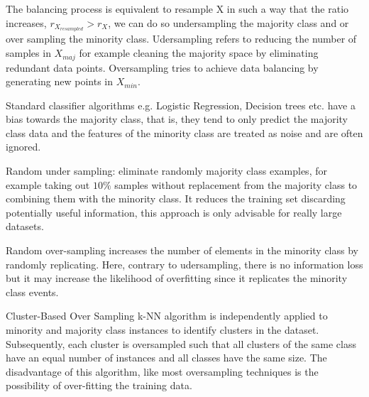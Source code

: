 \documentclass[11pt]{article}
\theoremstyle{definition}
\theoremstyle{remark}
\begin{document}
{%
The balancing process is equivalent to resample X in such a way that the ratio increases, $r_{X_{resampled}} > r_X$, we can do so undersampling the majority class and or over sampling the minority class. Udersampling refers to reducing the number of samples in $X_{maj}$ for example cleaning the majority space by eliminating redundant data points. Oversampling tries to achieve data balancing by generating new points in $X_{min}$.

Standard classifier algorithms e.g. Logistic Regression, Decision trees etc. have a bias towards the majority class, that is, they tend to only predict the majority class data and the features of the minority class are treated as noise and are often ignored. 


Random under sampling: eliminate randomly majority class examples, for example taking out $10\%$ samples without replacement from the majority class to combining them with the minority class. It reduces the training set discarding potentially useful information, this approach is only advisable for really large datasets.

Random over-sampling increases the number of elements in the minority class by randomly replicating. Here, contrary to udersampling, there is no information loss but it may increase the likelihood of overfitting since it replicates the minority class events.

Cluster-Based Over Sampling k-NN algorithm is independently applied to minority and majority class instances to identify clusters in the dataset. Subsequently, each cluster is oversampled such that all clusters of the same class have an equal number of instances and all classes have the same size. The disadvantage of this algorithm, like most oversampling techniques is the possibility of over-fitting the training data.  

}
\end{document}
